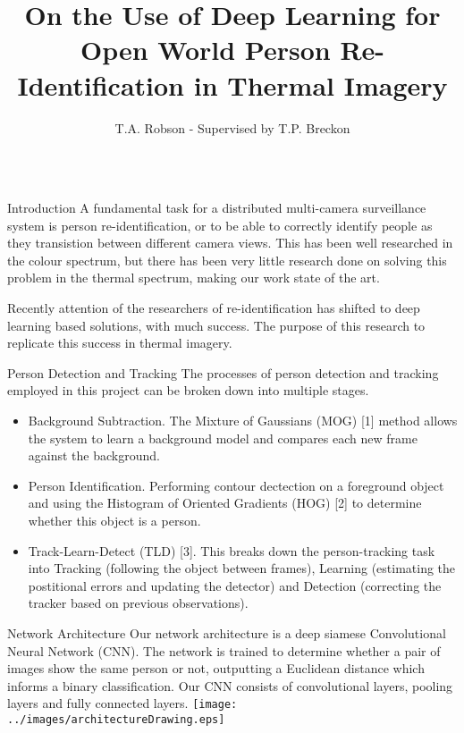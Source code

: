 \documentclass[final]{beamer}
\title[Thermal Re-ID]{On the Use of Deep Learning for Open World Person Re-Identification in Thermal Imagery}
\author{T.A. Robson - Supervised by T.P. Breckon}
\institute[Durham]{Department of Computer Science, Durham University}
\begin{document}
  \begin{frame}{} 
        
    \begin{columns}[t]
      \begin{column}{.5\linewidth}
      
      	\begin{block}{Introduction}
          A fundamental task for a distributed multi-camera surveillance system is person re-identification, or to be able to correctly identify people as they transistion between different camera views. This has been well researched in the colour spectrum, but there has been very little research done on solving this problem in the thermal spectrum, making our work state of the art. 
          
          Recently attention of the researchers of re-identification has shifted to deep learning based solutions, with much success. The purpose of this research to replicate this success in thermal imagery.
          
        \end{block}
        
        \begin{block}{Person Detection and Tracking}
        	The processes of person detection and tracking employed in this project can be broken down into multiple stages. 
        	\begin{itemize}
        	\item Background Subtraction. The Mixture of Gaussians (MOG) [1] method allows the system to learn a background model and compares each new frame against the background. 

        	\item Person Identification. Performing contour dectection on a foreground object and using the Histogram of Oriented Gradients (HOG) [2] to determine whether this object is a person.
        	
        	\item Track-Learn-Detect (TLD) [3]. This breaks down the person-tracking task into Tracking (following the object between frames), Learning (estimating the postitional errors and updating the detector) and Detection (correcting the tracker based on previous observations). 
          \end{itemize}
        \end{block}
       


        \begin{block}{Network Architecture}
        Our network architecture is a deep siamese Convolutional Neural Network (CNN). The network is trained to determine whether a pair of images show the same person or not, outputting a Euclidean distance which informs a binary classification. Our CNN consists of convolutional layers, pooling layers and fully connected layers. 
        \texttt{[image: ../images/architectureDrawing.eps]}
        \end{block}
	

\end{column}
\end{columns}
\end{frame}
\end{document}
